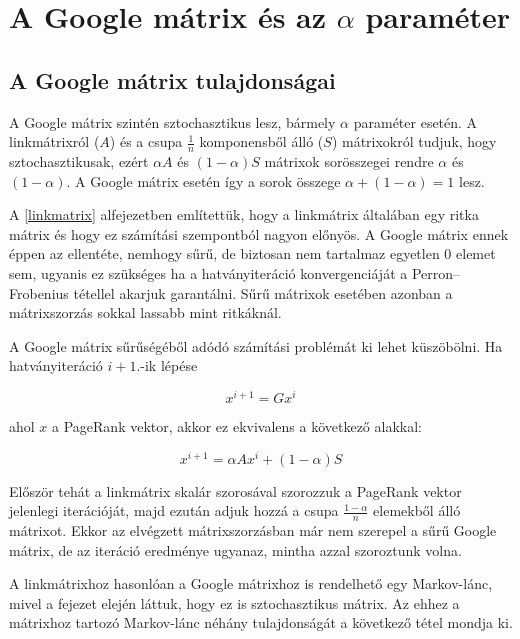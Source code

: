 \documentclass[12pt,a4paper]{article}
\begin{document}
\section{A Google mátrix és az $\alpha$ paraméter}

\subsection{A Google mátrix tulajdonságai}

A Google mátrix szintén sztochasztikus lesz, bármely $\alpha$ paraméter esetén. A linkmátrixról ($A$) és a csupa $\frac{1}{n}$ komponensből álló ($S$) mátrixokról tudjuk, hogy sztochasztikusak, ezért $\alpha A$ és $(1-\alpha)S$ mátrixok sorösszegei rendre $\alpha$ és $(1-\alpha)$. A Google mátrix esetén így a sorok összege $\alpha+(1-\alpha) = 1$ lesz.

\vspace{0.2cm}

A \ref{linkmatrix} alfejezetben említettük, hogy a linkmátrix általában egy ritka mátrix és hogy ez számítási szempontból nagyon előnyös. A Google mátrix ennek éppen az ellentéte, nemhogy sűrű, de biztosan nem tartalmaz egyetlen 0 elemet sem, ugyanis ez szükséges ha a hatványiteráció konvergenciáját a Perron–Frobenius tétellel akarjuk garantálni. Sűrű mátrixok esetében azonban a mátrixszorzás sokkal lassabb mint ritkáknál.

A Google mátrix sűrűségéből adódó számítási problémát ki lehet küszöbölni. Ha hatványiteráció $i+1$.-ik lépése

\[ x^{i+1} = G x^i \]

ahol $x$ a PageRank vektor, akkor ez ekvivalens a következő alakkal:

\[ x^{i+1} = \alpha A x^i + (1-\alpha)S\] 

Először tehát a linkmátrix skalár szorosával szorozzuk a PageRank vektor jelenlegi iterációját, majd ezután adjuk hozzá a csupa $\frac{1-\alpha}{n}$ elemekből álló mátrixot. Ekkor az elvégzett mátrixszorzásban már nem szerepel a sűrű Google mátrix, de az iteráció eredménye ugyanaz, mintha azzal szoroztunk volna. 

\vspace{0.2cm}
A linkmátrixhoz hasonlóan a Google mátrixhoz is rendelhető egy Markov-lánc, mivel a fejezet elején láttuk, hogy ez is sztochasztikus mátrix. Az ehhez a mátrixhoz tartozó Markov-lánc néhány tulajdonságát a következő tétel mondja ki.
\end{document}
